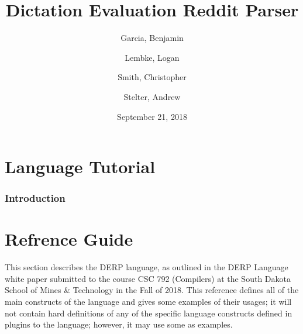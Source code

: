 \documentclass{article}
\title{\textbf{Dictation Evaluation Reddit Parser}}
\author{
Garcia, Benjamin \and
Lembke, Logan \and
Smith, Christopher \and
Stelter, Andrew
}
\date{September 21, 2018}
\begin{document}
\maketitle %

\newpage
\tableofcontents




\newpage


\part{Language Tutorial}
\section{Introduction}

%
%



\part{Refrence Guide}
This section describes the DERP language, as outlined in the DERP Language white paper submitted
to the course CSC 792 (Compilers) at the South Dakota School of Mines \& Technology in the Fall
of 2018. This reference defines all of the main constructs of the language and gives some examples
of their usages; it will not contain hard definitions of any of the specific language constructs
defined in plugins to the language; however, it may use some as examples.






\end{document}
